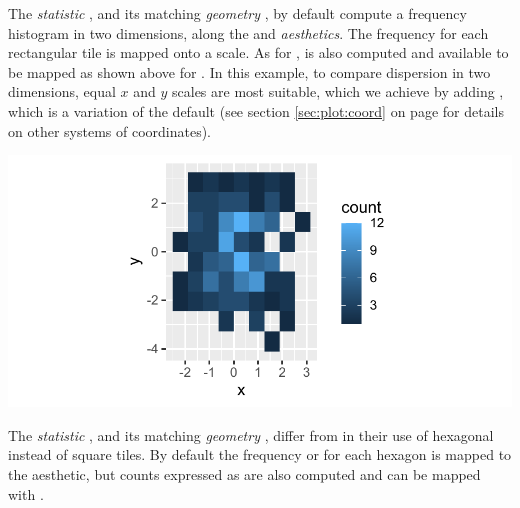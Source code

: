 \documentclass[krantz2]{krantz}\usepackage{knitr}
\begin{document}
The \emph{statistic} , and its matching \emph{geometry} , by default compute a frequency histogram in two dimensions, along the  and  \emph{aesthetics}. The frequency for each rectangular tile is mapped onto a  scale. As for ,  is also computed and available to be mapped as shown above for . In this example, to compare dispersion in two dimensions, equal $x$ and $y$ scales are most suitable, which we achieve by adding , which is a variation of the default   (see section \ref{sec:plot:coord} on page \pageref{sec:plot:coord} for details on other systems of coordinates).

\begin{knitrout}\footnotesize
{}\color{fgcolor}\begin{kframe}
\begin{alltt}
  \hlopt{+}
  \hlstd{(} \hlstd{=} \hlstd{)} \hlopt{+}
  \hlstd{(} \hlstd{=} \hlstd{)}
\end{alltt}
\end{kframe}

{\centering \includegraphics[width=.7\textwidth]{figure/pos-bin2d-plot-01-1} 

}


\end{knitrout}

The \emph{statistic} , and its matching \emph{geometry} , differ from  in their use of hexagonal instead of square tiles. By default the frequency or  for each hexagon is mapped to the  aesthetic, but counts expressed as  are also computed and can be mapped with .
\end{document}
